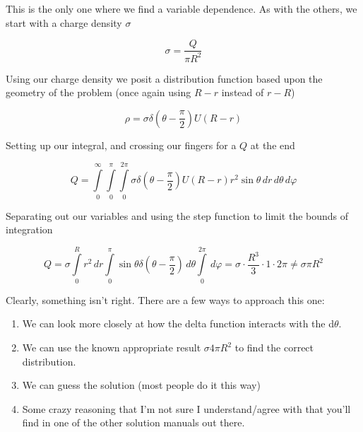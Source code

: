 This is the only one where we find a variable dependence.  As with the
others, we start with a charge density $\sigma$

\begin{equation}
  \sigma = \frac{Q}{\pi R^2}
\end{equation}

Using our charge density we posit a distribution function based upon
the geometry of the problem (once again using $R-r$ instead of $r-R$)

\begin{equation}
  \rho = \sigma \delta(\theta - \frac \pi 2) U(R - r)
\end{equation}

Setting up our integral, and crossing our fingers for a $Q$ at the end

\begin{equation}
  Q =
  \int\limits_0^\infty
  \int\limits_0^\pi
  \int\limits_0^{2\pi}
  \sigma \delta(\theta - \frac \pi 2) U(R - r)
  r^2\sin{\theta}
  \, dr
  \, d\theta
  \, d\varphi
\end{equation}

Separating out our variables and using the step function to limit the
bounds of integration

\begin{equation}
  Q =
  \sigma
  \int\limits_0^R
  r^2
  \, dr
  \int\limits_0^\pi
  \sin{\theta}
  \delta(\theta - \frac \pi 2)
  \, d\theta
  \int\limits_0^{2\pi}
  \, d\varphi
  = \sigma \cdot \frac{R^3}{3} \cdot 1 \cdot 2\pi
  \neq \sigma \pi R^2
\end{equation}

Clearly, something isn't right.  There are a few ways to approach this one:

\begin{enumerate}
  \item We can look more closely at how the delta function interacts
    with the d$\theta$.

  \item We can use the known appropriate result $\sigma 4 \pi R^2$ to
    find the correct distribution.

  \item We can guess the solution (most people do it this way)

  \item Some crazy reasoning that I'm not sure I understand/agree with
    that you'll find in one of the other solution manuals out there.
\end{enumerate}

